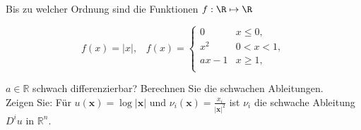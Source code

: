 \begin{exercise}

Bis zu welcher Ordnung sind die Funktionen $f: \R \mapsto \R$

\begin{equation*}
    f(x) = |x|, \hspace{10pt} f(x) =
    \begin{cases}
    0 & x \leq 0, \\
    x^2 & 0 < x < 1, \\
    ax - 1 & x \geq 1, \\
    \end{cases}
\end{equation*}

$a \in \mathbb{R}$ schwach differenzierbar? Berechnen Sie die schwachen Ableitungen. \\

Zeigen Sie: Für $u(\textbf{x}) = \log|\textbf{x}|$ und $\nu_i(\textbf{x}) = \frac{x_i}{|\textbf{x}|^2}$ ist $\nu_i$ die schwache Ableitung $D^iu$ in $\mathbb{R}^n$.

\end{exercise}

